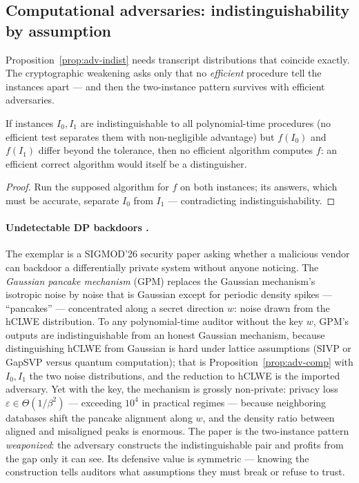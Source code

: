 \subsection{Computational adversaries: indistinguishability by assumption}
\label{sec:adv-comp}

Proposition~\ref{prop:adv-indist} needs transcript distributions that coincide exactly. The
cryptographic weakening asks only that no \emph{efficient} procedure tell the instances apart
--- and then the two-instance pattern survives with efficient adversaries.

\begin{proposition}\label{prop:adv-comp}
If instances $I_0, I_1$ are indistinguishable to all polynomial-time procedures (no efficient
test separates them with non-negligible advantage) but $f(I_0)$ and $f(I_1)$ differ beyond the
tolerance, then no efficient algorithm computes $f$: an efficient correct algorithm would
itself be a distinguisher. \eop
\end{proposition}

\begin{proof}
Run the supposed algorithm for $f$ on both instances; its answers, which must be accurate,
separate $I_0$ from $I_1$ --- contradicting indistinguishability.
\end{proof}

\paragraph{Undetectable DP backdoors \citep{sigmod26-123}.}
The exemplar is a SIGMOD'26 security paper asking whether a malicious vendor can backdoor a
differentially private system without anyone noticing. The \emph{Gaussian pancake mechanism}
(GPM) replaces the Gaussian mechanism's isotropic noise by noise that is Gaussian except for
periodic density spikes --- ``pancakes'' --- concentrated along a secret direction $w$: noise
drawn from the hCLWE distribution. To any polynomial-time auditor without the key $w$, GPM's
outputs are indistinguishable from an honest Gaussian mechanism, because distinguishing hCLWE
from Gaussian is hard under lattice assumptions (SIVP or GapSVP versus quantum computation);
that is Proposition~\ref{prop:adv-comp} with $I_0, I_1$ the two noise distributions, and the
reduction to hCLWE is the imported adversary. Yet with the key, the mechanism is grossly
non-private: privacy loss $\varepsilon \in \Theta(1/\beta^2)$ --- exceeding $10^4$ in practical
regimes --- because neighboring databases shift the pancake alignment along $w$, and the
density ratio between aligned and misaligned peaks is enormous. The paper is the two-instance
pattern \emph{weaponized}: the adversary constructs the indistinguishable pair and profits
from the gap only it can see. Its defensive value is symmetric --- knowing the construction
tells auditors what assumptions they must break or refuse to trust.

